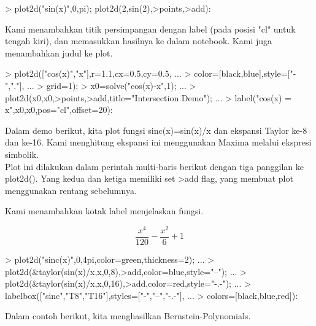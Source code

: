 \documentclass{report}
\begin{document}
\begin{eulernotebook}
\begin{eulercomment}
\begin{eulercomment}
\begin{eulercomment}
\begin{eulercomment}
\begin{eulercomment}
\end{eulercomment}
\begin{eulerprompt}
> plot2d("sin(x)",0,pi); plot2d(2,sin(2),>points,>add):
\end{eulerprompt}
\begin{eulercomment}
Kami menambahkan titik persimpangan dengan label (pada posisi "cl"
untuk tengah kiri), dan memasukkan hasilnya ke dalam notebook. Kami
juga menambahkan judul ke plot.
\end{eulercomment}
\begin{eulerprompt}
> plot2d(["cos(x)","x"],r=1.1,cx=0.5,cy=0.5, ...
>   color=[black,blue],style=["-","."], ...
>   grid=1);
> x0=solve("cos(x)-x",1);  ...
>  plot2d(x0,x0,>points,>add,title="Intersection Demo");  ...
>  label("cos(x) = x",x0,x0,pos="cl",offset=20):
\end{eulerprompt}
\begin{eulercomment}
Dalam demo berikut, kita plot fungsi sinc(x)=sin(x)/x dan ekspansi
Taylor ke-8 dan ke-16. Kami menghitung ekspansi ini menggunakan Maxima
melalui ekspresi simbolik.\\
Plot ini dilakukan dalam perintah multi-baris berikut dengan tiga
panggilan ke plot2d(). Yang kedua dan ketiga memiliki set \textgreater{}add flag,
yang membuat plot menggunakan rentang sebelumnya.

Kami menambahkan kotak label menjelaskan fungsi.
\end{eulercomment}
\begin{eulerformula}
\[
\frac{x^4}{120}-\frac{x^2}{6}+1
\]
\end{eulerformula}
\begin{eulerprompt}
> plot2d("sinc(x)",0,4pi,color=green,thickness=2); ...
>  plot2d(&taylor(sin(x)/x,x,0,8),>add,color=blue,style="--"); ...
>  plot2d(&taylor(sin(x)/x,x,0,16),>add,color=red,style="-.-"); ...
>  labelbox(["sinc","T8","T16"],styles=["-","--","-.-"], ...
>    colors=[black,blue,red]):
\end{eulerprompt}
\begin{eulercomment}
Dalam contoh berikut, kita menghasilkan Bernstein-Polynomials.


\end{eulercomment}
\end{eulercomment}
\end{eulercomment}
\end{eulercomment}
\end{eulercomment}
\end{eulernotebook}
\end{document}
